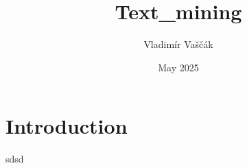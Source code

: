 \documentclass{article}
\title{Text_mining}
\author{Vladimír Vaščák}
\date{May 2025}
\begin{document}
\section{Introduction}
sdsd
\end{document}
